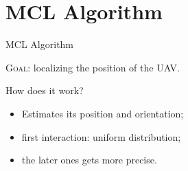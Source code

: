 \section{MCL Algorithm}


\begin{frame}{MCL Algorithm}
    
    {\scshape Goal:} localizing the position of the UAV.

    \begin{block}{How does it work?}
        \begin{itemize}
            \item Estimates its position and orientation;
            \item first interaction: uniform distribution;
            \item the later ones gets more precise.
        \end{itemize}
    \end{block}

\end{frame}


